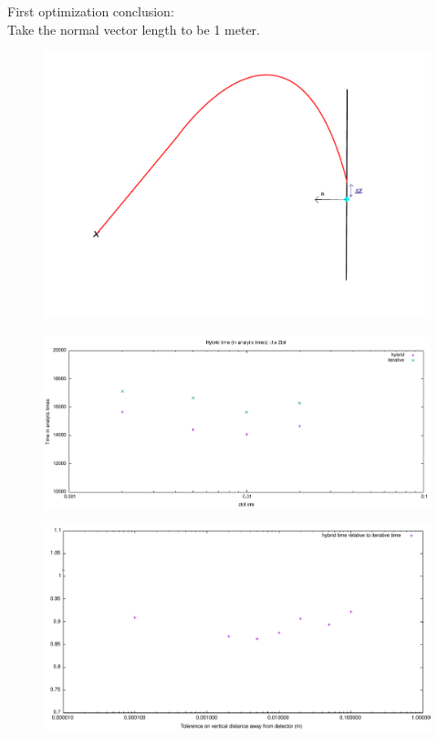 \documentclass{beamer}
\begin{document}
\begin{frame}
	First optimization conclusion:\\ Take the normal vector length to be 1 meter.
\end{frame}
\begin{frame}
	\begin{figure}
		\includegraphics[width=\textwidth]{figures/PrincipleIllu.pdf}
	\end{figure}
\end{frame}
\begin{frame}
	\begin{figure}
		\includegraphics[width=\textwidth]{figures/ZtolVsTime.pdf}
	\end{figure}
\end{frame}
\begin{frame}
	\begin{figure}
		\includegraphics[width=\textwidth]{figures/ZtolVsTime2.pdf}
	\end{figure}
\end{frame}
\end{document}
